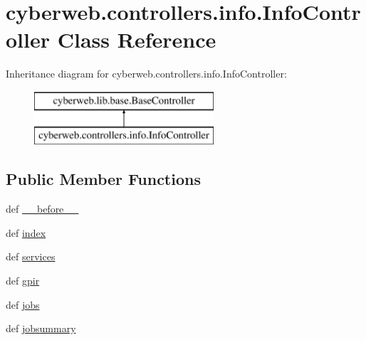 \hypertarget{classcyberweb_1_1controllers_1_1info_1_1_info_controller}{\section{cyberweb.\-controllers.\-info.\-Info\-Controller \-Class \-Reference}
\label{classcyberweb_1_1controllers_1_1info_1_1_info_controller}
}
\-Inheritance diagram for cyberweb.\-controllers.\-info.\-Info\-Controller\-:\begin{figure}[H]
\begin{center}
\leavevmode
\includegraphics[height=2.000000cm]{classcyberweb_1_1controllers_1_1info_1_1_info_controller}
\end{center}
\end{figure}
\subsection*{\-Public \-Member \-Functions}
\begin{DoxyCompactItemize}
\item 
def \hyperlink{classcyberweb_1_1controllers_1_1info_1_1_info_controller_a83ef475158d7d5c9b4c06f0598b36933}{\-\_\-\-\_\-before\-\_\-\-\_\-}
\item 
def \hyperlink{classcyberweb_1_1controllers_1_1info_1_1_info_controller_aacc97caa12fa0b11aead6b9e9e3a98c4}{index}
\item 
def \hyperlink{classcyberweb_1_1controllers_1_1info_1_1_info_controller_a67bf15c2a4e2c74f394bd50772419956}{services}
\item 
def \hyperlink{classcyberweb_1_1controllers_1_1info_1_1_info_controller_ab31f41db51a09ce7734a3756e9c68e74}{gpir}
\item 
def \hyperlink{classcyberweb_1_1controllers_1_1info_1_1_info_controller_a2a20fc1044a834acf21aae08638e965f}{jobs}
\item 
def \hyperlink{classcyberweb_1_1controllers_1_1info_1_1_info_controller_ac79a89e35d202efa13cd723489c98ee6}{jobsummary}
\end{DoxyCompactItemize}


